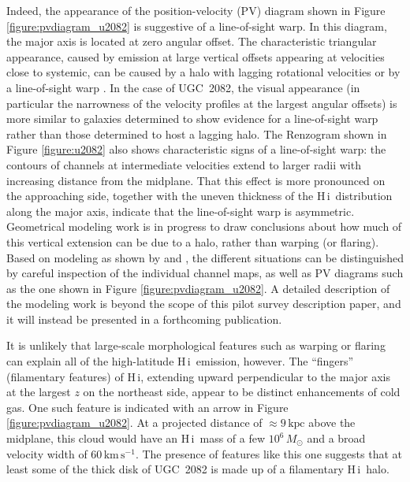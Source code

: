 \documentclass[oldversion]{aa}
\newcommand{\HI}{{\sc H\,i}}
\begin{document}
Indeed, the appearance of the position-velocity (PV) diagram shown in Figure \ref{figure:pvdiagram_u2082} is suggestive of a line-of-sight warp. In this diagram, the major axis is located at zero angular offset. The characteristic triangular appearance, caused by emission at large vertical offsets appearing at velocities close to systemic, can be caused by a halo with lagging rotational velocities or by a line-of-sight warp \citep[e.g.][]{oosterloo_etal_2007}. In the case of UGC~2082, the visual appearance (in particular the narrowness of the velocity profiles at the largest angular offsets) is more similar to galaxies determined to show evidence for a line-of-sight warp \citep[e.g.,][]{rand_benjamin_2008,gentile_etal_2003} rather than those determined to host a lagging halo. The Renzogram shown in Figure \ref{figure:u2082} also shows characteristic signs of a line-of-sight warp: the contours of channels at intermediate velocities extend to larger radii with increasing distance from the midplane. That this effect is more pronounced on the approaching side, together with the uneven thickness of the \HI\ distribution along the major axis, indicate that the line-of-sight warp is asymmetric. Geometrical modeling work is in progress to draw conclusions about how much of this vertical extension can be due to a halo, rather than warping (or flaring). Based on modeling as shown by \citet[][their Figure 4]{swaters_etal_1997} and \citet[][their Figure 12]{oosterloo_etal_2007}, the different situations can be distinguished by careful inspection of the individual channel maps, as well as PV diagrams such as the one shown in Figure \ref{figure:pvdiagram_u2082}. A detailed description of the modeling work is beyond the scope of this pilot survey description paper, and it will instead be presented in a forthcoming publication.

It is unlikely that large-scale morphological features such as warping or flaring can explain all of the high-latitude \HI\ emission, however. The ``fingers'' (filamentary features) of \HI, extending upward perpendicular to the major axis at the largest $z$ on the northeast side, appear to be distinct enhancements of cold gas. One such feature is indicated with an arrow in Figure \ref{figure:pvdiagram_u2082}. At a projected distance of $\approx9\,\mathrm{kpc}$ above the midplane, this cloud would have an \HI\ mass of a few $10^6\,M_\odot$ and a broad velocity width of $60\,\mathrm{km\,s^{-1}}$. The presence of features like this one suggests that at least some of the thick disk of UGC~2082 is made up of a filamentary \HI\ halo.
\end{document}
